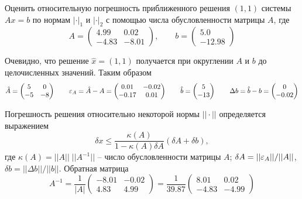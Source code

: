 \newpage
\begin{problem}
    Оценить относительную погрешность приближенного решения $(1, 1)$ системы
    $Ax = b$ по нормам $|\cdot|_1$ и $|\cdot|_2$ с помощью числа обусловленности
    матрицы $A$, где
    \begin{equation*}
        A = \begin{pmatrix}
            4.99 & 0.02\\
            -4.83 & -8.01
        \end{pmatrix}
    ,\qquad
    b = \begin{pmatrix}
            5.0\\
            -12.98
        \end{pmatrix}
    \end{equation*}
\end{problem}


Очевидно, что решение $\hat{x} = (1, 1)$ получается при округлении $A$ и $b$ до
целочисленных значений. Таким образом
\begin{equation*}
    \hat{A} =
    \begin{pmatrix}
        5 & 0\\
        -5 & -8
    \end{pmatrix}
    \qquad
    \varepsilon_A = \hat{A} - A =
    \begin{pmatrix}
        0.01 & -0.02\\
        -0.17 & 0.01
    \end{pmatrix}
    \qquad
    \hat{b} =
    \begin{pmatrix}
        5\\
        -13
    \end{pmatrix}
    \qquad
    \Delta{b} = \hat{b} - b =
    \begin{pmatrix}
        0\\
        -0.02
    \end{pmatrix}
\end{equation*}

Погрешность решения относительно некоторой нормы $||\cdot||$ определяется
выражением
\begin{equation*}
    \delta{x} \leq \frac{\kappa(A)}{1-\kappa(A)\delta{A}}(\delta{A}+\delta{b}),
\end{equation*}
где $\kappa(A) = ||A|| \; ||A^{-1}||$ -- число обусловленности матрицы $A$;
$\delta{A} = ||\varepsilon_A|| / ||A||$, $\delta{b} = ||\Delta{b}|| / ||b||$. Обратная
матрица
\begin{equation*}
    A^{-1} = \frac{1}{|A|}
    \begin{pmatrix}
        -8.01 & -0.02\\
        4.83 & 4.99
    \end{pmatrix}
    = \frac{1}{39.87}
    \begin{pmatrix}
        8.01 & 0.02\\
        -4.83 & -4.99
    \end{pmatrix}
\end{equation*}

